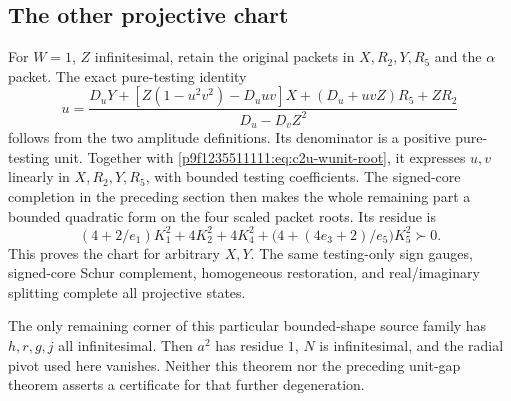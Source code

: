 \subsection{The other projective chart}
For $W=1$, $Z$ infinitesimal, retain the original packets in
$X,R_2,Y,R_5$ and the $\alpha$ packet.  The exact pure-testing identity
\begin{equation}
u=\frac{D_uY+[Z(1-u^2v^2)-D_uuv]X+(D_u+uvZ)R_5+ZR_2}
{D_u-D_vZ^2}
\label{p53752031d16c:eq:c2y-Wunit}
\end{equation}
follows from the two amplitude definitions.  Its denominator is a
positive pure-testing unit.  Together with \eqref{p9f1235511111:eq:c2u-wunit-root},
it expresses $u,v$ linearly in $X,R_2,Y,R_5$, with bounded testing
coefficients.  The signed-core completion in the preceding section
then makes the whole remaining part a bounded quadratic form on the
four scaled packet roots.  Its residue is
\[
(4+2/e_1)K_1^2+4K_2^2+4K_4^2+
\bigl(4+(4e_3+2)/e_5\bigr)K_5^2\succ0.
\]
This proves the chart for arbitrary $X,Y$.  The same testing-only sign
gauges, signed-core Schur complement, homogeneous restoration, and
real/imaginary splitting complete all projective states.

The only remaining corner of this particular bounded-shape source
family has $h,r,g,j$ all infinitesimal.  Then $a^2$ has residue $1$,
$N$ is infinitesimal, and the radial pivot used here vanishes.
Neither this theorem nor the preceding unit-gap theorem asserts a
certificate for that further degeneration.
